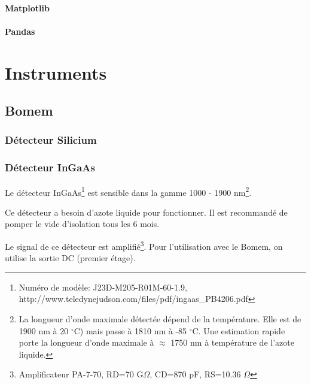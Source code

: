 \documentclass[11pt,francais]{book} %
\begin{document}
\subsubsection{Matplotlib}

\subsubsection{Pandas}




\chapter{Instruments}


\section{Bomem}

\subsection{Détecteur Silicium}

\subsection{Détecteur InGaAs}

Le détecteur InGaAs\footnote{Numéro de modèle: J23D-M205-R01M-60-1.9, http://www.teledynejudson.com/files/pdf/ingaas\_PB4206.pdf} est sensible dans la gamme 1000 - 1900 nm\footnote{La longueur d'onde maximale détectée dépend de la température. Elle est de 1900 nm à 20 $^{\circ}$C) mais passe à 1810 nm à -85 $^{\circ}$C. Une estimation rapide porte la longueur d'onde maximale à $\approx$ 1750 nm à température de l'azote liquide.}.

Ce détecteur a besoin d'azote liquide pour fonctionner.
Il est recommandé de pomper le vide d'isolation tous les 6 mois.

Le signal de ce détecteur est amplifié\footnote{Amplificateur PA-7-70, RD=70 G$\Omega$, CD=870 pF, RS=10.36 $\Omega$}.
Pour l'utilisation avec le Bomem, on utilise la sortie DC (premier étage).
\end{document}
